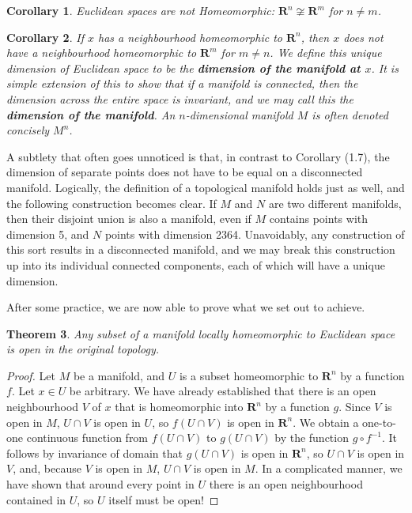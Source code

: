 \documentclass[12pt]{report}
\theoremstyle{plain}
\newtheorem{theorem}{Theorem}[chapter]
\newtheorem{corollary}[theorem]{Corollary}
\theoremstyle{definition}
\begin{document}
\begin{corollary}
    Euclidean spaces are not Homeomorphic: $\mathbf{R}^n \not \cong \mathbf{R}^m$ for $n \neq m$.
\end{corollary}

\begin{corollary}
    If $x$ has a neighbourhood homeomorphic to $\mathbf{R}^n$, then $x$ does not have a neighbourhood homeomorphic to $\mathbf{R}^m$ for $m \neq n$. We define this unique dimension of Euclidean space to be the {\bf dimension of the manifold at $x$}. It is simple extension of this to show that if a manifold is connected, then the dimension across the entire space is invariant, and we may call this the {\bf dimension of the manifold}. An $n$-dimensional manifold $M$ is often denoted concisely $M^n$.
\end{corollary}

A subtlety that often goes unnoticed is that, in contrast to Corollary (1.7), the dimension of separate points does not have to be equal on a disconnected manifold. Logically, the definition of a topological manifold holds just as well, and the following construction becomes clear. If $M$ and $N$ are two different manifolds, then their disjoint union is also a manifold, even if $M$ contains points with dimension 5, and $N$ points with dimension 2364. Unavoidably, any construction of this sort results in a disconnected manifold, and we may break this construction up into its individual connected components, each of which will have a unique dimension.

After some practice, we are now able to prove what we set out to achieve.

\begin{theorem}
    Any subset of a manifold locally homeomorphic to Euclidean space is open in the original topology.
\end{theorem}
\begin{proof}
    Let $M$ be a manifold, and $U$ is a subset homeomorphic to $\mathbf{R}^n$ by a function $f$. Let $x \in U$ be arbitrary. We have already established that there is an open neighbourhood $V$ of $x$ that is homeomorphic into $\mathbf{R}^n$ by a function $g$. Since $V$ is open in $M$, $U \cap V$ is open in $U$, so $f(U \cap V)$ is open in $\mathbf{R}^n$. We obtain a one-to-one continuous function from $f(U \cap V)$ to $g(U \cap V)$ by the function $g \circ f^{-1}$. It follows by invariance of domain that $g(U \cap V)$ is open in $\mathbf{R}^n$, so $U \cap V$ is open in $V$, and, because $V$ is open in $M$, $U \cap V$ is open in $M$. In a complicated manner, we have shown that around every point in $U$ there is an open neighbourhood contained in $U$, so $U$ itself must be open!
\end{proof}
\end{document}
